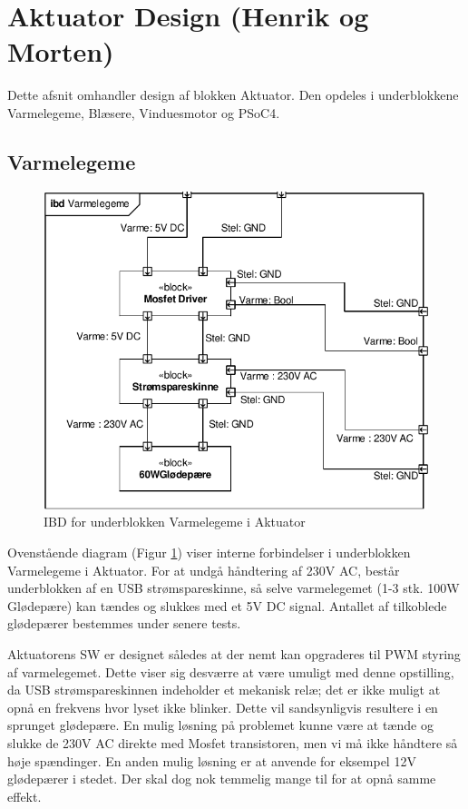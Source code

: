 \section{Aktuator Design (Henrik og Morten)}

Dette afsnit omhandler design af blokken Aktuator. Den opdeles i underblokkene Varmelegeme, Blæsere, Vinduesmotor og PSoC4.

\subsection{Varmelegeme}

\begin{figure}[h]
\centering 
\includegraphics[width={\textwidth-5cm}, trim=0 0 0 0, clip=true] {../fig/ibd_varmelegeme.pdf}
\caption{IBD for underblokken Varmelegeme i Aktuator}
\label{fig:ibd_varmelegeme}
\end{figure}

Ovenstående diagram (Figur \ref{fig:ibd_varmelegeme}) viser interne forbindelser i underblokken Varmelegeme i Aktuator. 
For at undgå håndtering af 230V AC, består underblokken af en USB strømspareskinne, så selve varmelegemet (1-3 stk. 100W Glødepære) kan tændes og slukkes med et 5V DC signal. 
Antallet af tilkoblede glødepærer bestemmes under senere tests.

Aktuatorens SW er designet således at der nemt kan opgraderes til PWM styring af varmelegemet. 
Dette viser sig desværre at være umuligt med denne opstilling, da USB strømspareskinnen indeholder et mekanisk relæ; det er ikke muligt at opnå en frekvens hvor lyset ikke blinker. 
Dette vil sandsynligvis resultere i en sprunget glødepære.
En mulig løsning på problemet kunne være at tænde og slukke de 230V AC direkte med Mosfet transistoren, men vi må ikke håndtere så høje spændinger. 
En anden mulig løsning er at anvende for eksempel 12V glødepærer i stedet. Der skal dog nok temmelig mange til for at opnå samme effekt. 

